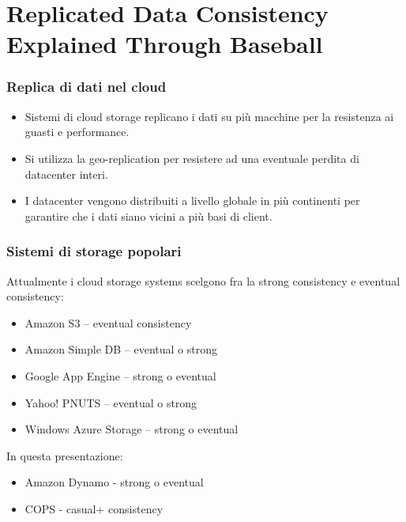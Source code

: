 \section{Replicated Data Consistency Explained Through Baseball}

\begin{frame}
 \frametitle{Replica di dati nel cloud}
 \begin{itemize}
   \item Sistemi di cloud storage replicano i dati su più macchine per la resistenza ai guasti e performance.
   \item Si utilizza la geo-replication per resistere ad una eventuale perdita di datacenter interi.
   \item I datacenter vengono distribuiti a livello globale in più continenti per garantire che i dati siano vicini a più basi di client.
 \end{itemize}
  
\end{frame}

\begin{frame}
 \frametitle{Sistemi di storage popolari}
Attualmente i cloud storage systems scelgono fra la strong consistency e eventual consistency:
 \begin{itemize}
   \item Amazon S3 – eventual consistency
   \item Amazon Simple DB – eventual o strong
   \item Google App Engine – strong o eventual
   \item Yahoo! PNUTS – eventual o strong
   \item Windows Azure Storage – strong o eventual
 \end{itemize}
In questa presentazione:
\begin{itemize}
  \item Amazon Dynamo - strong o eventual
  \item COPS - casual+ consistency
\end{itemize}
\end{frame}

